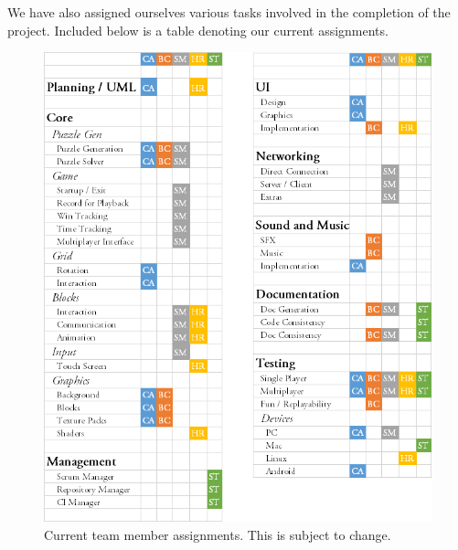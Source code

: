 \documentclass[12pt]{article}
\begin{document}
\clearpage

We have also assigned ourselves various tasks involved in the completion of the project. Included below is a table denoting our current assignments.

    \begin{figure}[H]
        \centering
        \includegraphics[width=5in]{Assignments.png}
        \caption{Current team member assignments. This is subject to change.}
    \end{figure}



\end{document}
